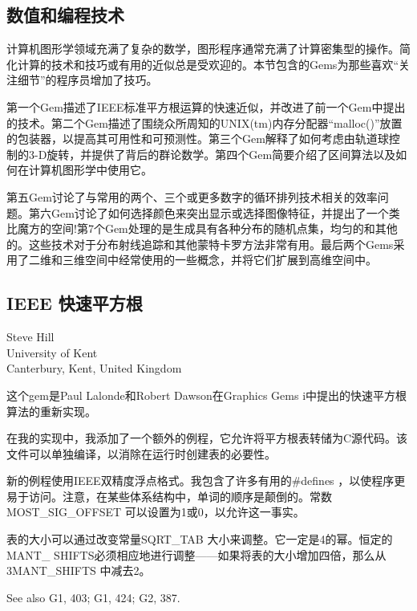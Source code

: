 \begin{CJK}{UTF8}{gkai}
\chapter{数值和编程技术}
\end{CJK}


\begin{CJK}{UTF8}{gbsn}
计算机图形学领域充满了复杂的数学，图形程序通常充满了计算密集型的操作。简化计算的技术和技巧或有用的近似总是受欢迎的。本节包含的Gems为那些喜欢“关注细节”的程序员增加了技巧。


第一个Gem描述了IEEE标准平方根运算的快速近似，并改进了前一个Gem中提出的技术。第二个Gem描述了围绕众所周知的UNIX(tm)内存分配器“malloc()”放置的包装器，以提高其可用性和可预测性。第三个Gem解释了如何考虑由轨道球控制的3-D旋转，并提供了背后的群论数学。第四个Gem简要介绍了区间算法以及如何在计算机图形学中使用它。


第五Gem讨论了与常用的两个、三个或更多数字的循环排列技术相关的效率问题。第六Gem讨论了如何选择颜色来突出显示或选择图像特征，并提出了一个类比魔方的空间!第7个Gem处理的是生成具有各种分布的随机点集，均匀的和其他的。这些技术对于分布射线追踪和其他蒙特卡罗方法非常有用。最后两个Gems采用了二维和三维空间中经常使用的一些概念，并将它们扩展到高维空间中。

\newpage
\section{IEEE 快速平方根}
\begin{center}
\small{
Steve Hill\\
University of Kent\\
Canterbury, Kent, United Kingdom}
\end{center}
这个gem是Paul Lalonde和Robert Dawson在Graphics Gems i中提出的快速平方根算法的重新实现。


在我的实现中，我添加了一个额外的例程，它允许将平方根表转储为C源代码。该文件可以单独编译，以消除在运行时创建表的必要性。


新的例程使用IEEE双精度浮点格式。我包含了许多有用的\#defines ，以使程序更易于访问。注意，在某些体系结构中，单词的顺序是颠倒的。常数MOST\_SIG\_OFFSET 可以设置为1或0，以允许这一事实。


表的大小可以通过改变常量SQRT\_TAB 大小来调整。它一定是4的幂。恒定的MANT\_ SHIFTS必须相应地进行调整——如果将表的大小增加四倍，那么从3MANT\_SHIFTS 中减去2。


See also G1, 403; G1, 424; G2, 387.\\


\end{CJK}
